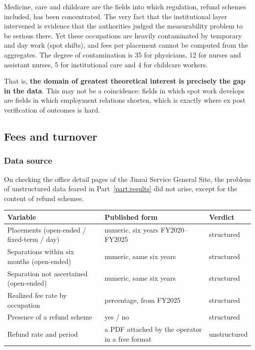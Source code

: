 \begin{remark}
\label{rem:data-gap-relevance}
Medicine, care and childcare are the fields into which regulation, refund schemes included, has
been concentrated. The very fact that the institutional layer intervened is evidence that the
authorities judged the measurability problem to be serious there. Yet these occupations are
heavily contaminated by temporary and day work (spot shifts), and fees per placement cannot be
computed from the aggregates. The degree of contamination is 35 for physicians, 12 for nurses and
assistant nurses, 5 for institutional care and 4 for childcare workers.

That is, \textbf{the domain of greatest theoretical interest is precisely the gap in the data}.
This may not be a coincidence: fields in which spot work develops are fields in which employment
relations shorten, which is exactly where ex post verification of outcomes is hard.
\end{remark}

\subsection{Fees and turnover}

\subsubsection{Data source}
\label{sec:jinzai-structure}

On checking the office detail pages of the Jinzai Service General Site, the problem of
unstructured data feared in Part~\ref{part:results} did not arise, except for the content of
refund schemes.

\begin{center}
\begin{tabularx}{\textwidth}{@{}lXl@{}}
\toprule
Variable & Published form & Verdict \\
\midrule
Placements (open-ended / fixed-term / day) & numeric, six years FY2020--FY2025 & structured \\
Separations within six months (open-ended) & numeric, same six years & structured \\
Separation not ascertained (open-ended) & numeric, same six years & structured \\
Realized fee rate by occupation & percentage, from FY2025 & structured \\
Presence of a refund scheme & yes / no & structured \\
Refund rate and period & a PDF attached by the operator in a free format & unstructured \\
\bottomrule
\end{tabularx}
\label{tab:jinzai-variables}
\end{center}

